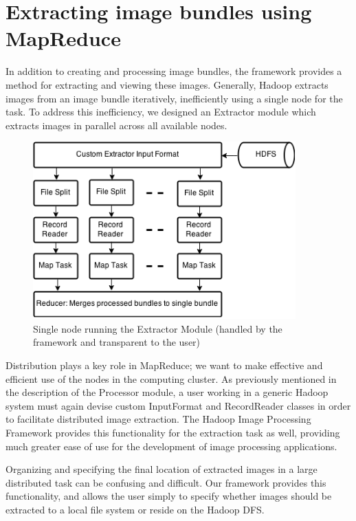 \documentclass{osuthesis}
\begin{document}
				\section{Extracting image bundles using MapReduce}
				In addition to creating and processing image bundles, the framework
				provides a method for extracting and viewing these images.  Generally,
				Hadoop extracts images from an image bundle iteratively, inefficiently
				using a single node for the task. To address this inefficiency, we
				designed an Extractor module which extracts images in parallel across
				all available nodes.
				\begin{figure}[h]
					\centering
					\includegraphics[width=0.90\textwidth]{ext-node}
					\caption{Single node running the Extractor Module (handled by the
						framework and transparent to the user)}
					\label{fig:ext-node}
				\end{figure}
				Distribution plays a key role in MapReduce; we want to make effective
				and efficient use of the nodes in the computing cluster.  As
				previously mentioned in the description of the Processor module, a
				user working in a generic Hadoop system must again devise custom
				InputFormat and RecordReader classes in order to facilitate
				distributed image extraction.  The Hadoop Image Processing Framework
				provides this functionality for the extraction task as well, providing
				much greater ease of use for the development of image processing
				applications.
				
				Organizing and specifying the final location of extracted images in a
				large distributed task can be confusing and difficult.  Our framework
				provides this functionality, and allows the user simply to specify
				whether images should be extracted to a local file system or reside on
				the Hadoop DFS.
				
\end{document}

